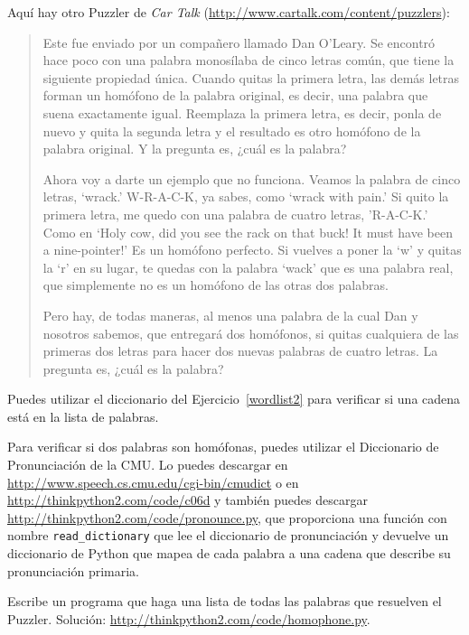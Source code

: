 \documentclass[10pt]{book}
\begin{document}
\begin{exercise}

Aquí hay otro Puzzler de {\em Car Talk}
(\url{http://www.cartalk.com/content/puzzlers}):

\begin{quote}
Este fue enviado por un compañero llamado Dan O'Leary. Se encontró hace poco con una palabra
monosílaba de cinco letras común, que tiene la siguiente propiedad
única. Cuando quitas la primera letra, las demás letras forman
un homófono de la palabra original, es decir, una palabra que suena exactamente
igual. Reemplaza la primera letra, es decir, ponla de nuevo y quita
la segunda letra y el resultado es otro homófono de la
palabra original. Y la pregunta es, ¿cuál es la palabra?

Ahora voy a darte un ejemplo que no funciona. Veamos la palabra
de cinco letras, `wrack.' W-R-A-C-K, ya sabes, como `wrack with
pain.' Si quito la primera letra, me quedo con una palabra de cuatro
letras, 'R-A-C-K.' Como en `Holy cow, did you see the rack on that buck!
It must have been a nine-pointer!' Es un homófono perfecto. Si
vuelves a poner la `w' y quitas la `r' en su lugar, te quedas con la
palabra `wack' que es una palabra real, que simplemente no es un homófono de las
otras dos palabras.

Pero hay, de todas maneras, al menos una palabra de la cual Dan y nosotros sabemos,
que entregará dos homófonos, si quitas cualquiera de las primeras dos
letras para hacer dos nuevas palabras de cuatro letras. La pregunta es, ¿cuál
es la palabra?
\end{quote}

Puedes utilizar el diccionario del Ejercicio~\ref{wordlist2} para verificar
si una cadena está en la lista de palabras.

Para verificar si dos palabras son homófonas, puedes utilizar el
Diccionario de Pronunciación de la CMU.  Lo puedes descargar en
\url{http://www.speech.cs.cmu.edu/cgi-bin/cmudict} o en
\url{http://thinkpython2.com/code/c06d} y también puedes descargar
\url{http://thinkpython2.com/code/pronounce.py}, que proporciona una función
con nombre \verb"read_dictionary" que lee el diccionario de pronunciación y
devuelve un diccionario de Python que mapea de cada palabra a una cadena que 
describe su pronunciación primaria.

Escribe un programa que haga una lista de todas las palabras que resuelven el Puzzler.
Solución: \url{http://thinkpython2.com/code/homophone.py}.

\end{exercise}
\end{document}
